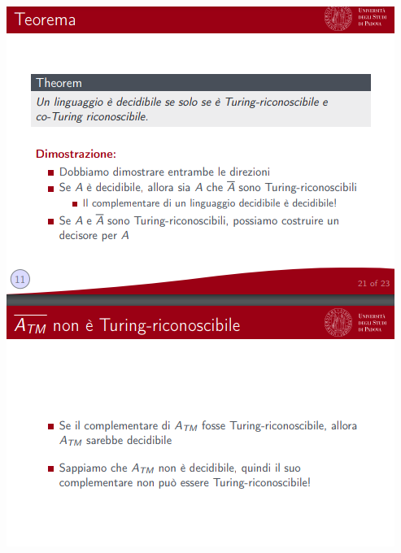 \documentclass[]{article}
\begin{document}
\begin{center}
					\includegraphics[scale=0.8]{indecidibile7.png}
				\end{center}
\end{document}
